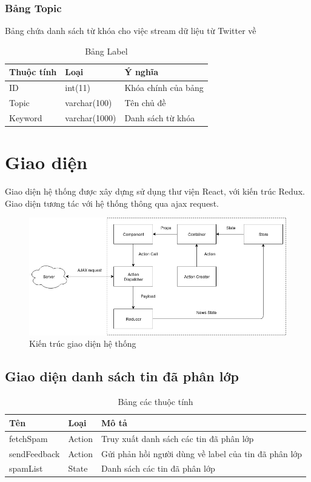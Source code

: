 		\subsubsection{Bảng Topic}
		Bảng chứa danh sách từ khóa cho việc stream dữ liệu từ Twitter về
			\begin{table}[H]
				\centering
				\setlength\extrarowheight{3pt}
				\begin{tabular}{|l|l|l|}
					\hline
					\textbf{Thuộc tính}     & \textbf{Loại} & \textbf{Ý nghĩa} \\\hline
					ID      	& int(11)       &  Khóa chính của bảng\\\hline
					Topic	& varchar(100)      &  Tên chủ đề\\\hline
					Keyword	& varchar(1000)    	&  Danh sách từ khóa\\\hline
				\end{tabular}
				\caption{Bảng Label}
				\label{tab:topic}
			\end{table}
\section{Giao diện}
Giao diện hệ thống được xây dựng sử dụng thư viện React, với kiến trúc Redux. Giao diện tương tác với hệ thống thông qua ajax request.
	\begin{figure}[H]
		\centering
		\includegraphics[width=1\linewidth]{Chapter3/Chapter3Figs/FrontEndArch}
		\caption{Kiến trúc giao diện hệ thống}
		\label{fig:layers}
	\end{figure}

  \subsection{Giao diện danh sách tin đã phân lớp}
  \begin{table}[H]
    \centering
    \setlength{\tabcolstep}{12pt}
    \begin{tabular}{@{}lll@{}} \toprule
      Tên  & Loại   & Mô tả \\ \midrule
      fetchSpam &  Action   & Truy xuất danh sách các tin đã phân lớp \\
      sendFeedback & Action & Gửi phản hồi người dùng về label của tin đã phân lớp \\
      spamList     & State       & Danh sách các tin đã phân lớp  \\ \bottomrule
    \end{tabular}
    \caption{Bảng các thuộc tính}
  \end{table}

